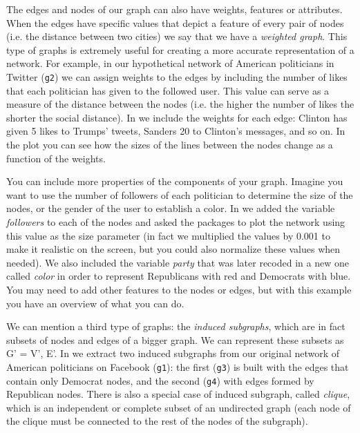
The edges and nodes of our graph can also have weights, features or attributes. When the edges have specific values that depict a feature of every pair of nodes (i.e. the distance between two cities) we say that we have a \textit{weighted graph}. This type of graphs is extremely useful for creating a more accurate representation of a network. For example, in our hypothetical network of American politicians in Twitter (\texttt{g2}) we can assign weights to the edges by including the number of likes that each politician has given to the followed user. This value  can serve as a measure of the distance between the nodes (i.e. the higher the number of likes the shorter the social distance). In  we include the weights for each edge: Clinton has given 5 likes to Trumps' tweets, Sanders 20 to Clinton's messages, and so on. In the plot you can see how the sizes of the lines between the nodes change as a function of the weights.


You can include more properties of the components of your graph. Imagine you want to use the number of followers of each politician to determine the size of the nodes, or the gender of the user to establish a color. In  we added the variable \emph{followers} to each of the nodes and asked the packages to plot the network using this value as the size parameter (in fact we multiplied the values by 0.001 to make it realistic on the screen, but you could also normalize these values when needed). We also included the variable \emph{party} that was later recoded in a new one called \emph{color} in order to represent Republicans with red and Democrats with blue.  You may need to add other features to the nodes or edges, but with this example you have an overview of what you can do.


We can  mention a third type of graphs: the \textit{induced subgraphs}, which are in fact subsets of nodes and edges of a bigger graph. We can represent these subsets as G' = V', E'. In  we extract two induced subgraphs from our original network of American politicians on Facebook (\texttt{g1}): the first (\texttt{g3}) is built with the edges that contain only Democrat nodes, and the second (\texttt{g4}) with edges formed by Republican nodes. There is also a special case of induced subgraph, called \textit{clique}, which is an independent or complete subset of an undirected graph (each node of the clique must be connected to the rest of the nodes of the subgraph).

